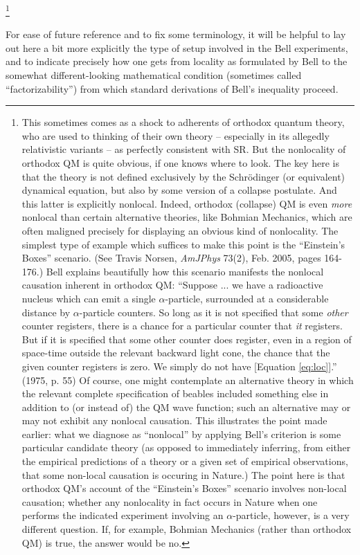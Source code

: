 \documentclass[aps,prc,twocolumn]{revtex4}
\begin{document}
\footnote{This sometimes comes as a shock to adherents of orthodox
quantum theory, who are used to thinking of their own theory --
especially in its allegedly relativistic variants -- as perfectly
consistent with SR.  But the nonlocality of orthodox QM is quite
obvious, if one knows where to look.  The key here is that the
theory is not defined exclusively by the Schr\"odinger (or
equivalent) dynamical equation, but also by some version of a
collapse postulate.  And this latter is explicitly nonlocal.
Indeed, orthodox (collapse) QM is even \emph{more} nonlocal than
certain alternative theories, like Bohmian Mechanics, which are 
often maligned precisely for displaying an obvious kind of nonlocality.
The simplest type
of example which suffices to make this point is the ``Einstein's
Boxes'' scenario.  (See Travis Norsen, \emph{AmJPhys} 73(2), Feb. 2005,
pages 164-176.)  Bell explains beautifully how
this scenario manifests the nonlocal causation inherent in orthodox
QM:  ``Suppose ... we have a radioactive nucleus which can emit a
single $\alpha$-particle, surrounded at a considerable distance by
$\alpha$-particle counters.  So long as it is not specified that
some \emph{other} counter registers, there is a chance for a
particular counter that \emph{it} registers.  But if it is specified
that some other counter does register, even in a region of
space-time outside the relevant backward light cone, the chance that
the given counter registers is zero.  We simply do not have
[Equation \ref{eq:loc}].''  (1975, p. 55)  Of course, one might
contemplate an alternative theory in which the relevant complete
specification of beables included something else in addition to (or
instead of) the QM wave function; such an alternative may or may not
exhibit any nonlocal causation.  This illustrates the point made
earlier:  what we diagnose as ``nonlocal'' by applying Bell's
criterion is some particular candidate theory (as opposed to
immediately inferring, from either the empirical predictions of a
theory or a given set of empirical observations, that some non-local
causation is occuring in Nature.)  The point here is that
orthodox QM's account of the ``Einstein's Boxes'' scenario involves
non-local causation; whether any nonlocality in fact occurs in Nature
when one performs the indicated experiment involving an
$\alpha$-particle, however, is a very different question.  If, for
example, Bohmian Mechanics (rather than orthodox QM) is true, the
answer would be no.}

For ease of future reference and to fix some terminology, it will be 
helpful to lay out here a bit more explicitly the type of setup
involved in the Bell experiments, and to indicate precisely how one
gets from locality as formulated by Bell to the somewhat
different-looking mathematical condition (sometimes called
``factorizability'') from which standard derivations of Bell's
inequality proceed.  
\end{document}
